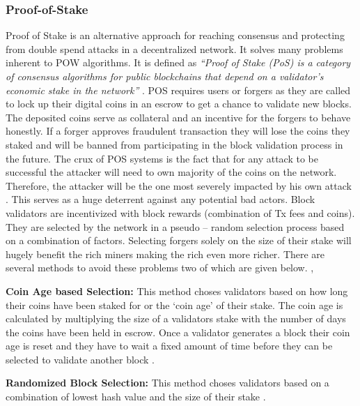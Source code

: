 \subsubsection{Proof-of-Stake} \label{PS}
Proof of Stake is an alternative approach for reaching consensus and protecting from double spend attacks in a decentralized network. It solves many problems inherent to POW algorithms. It is defined as \textit{“Proof of Stake (PoS) is a category of consensus algorithms for public blockchains that depend on a validator's economic stake in the network”} \cite{ethwiki:006}. POS requires users or forgers as they are called to lock up their digital coins in an escrow to get a chance to validate new blocks. The deposited coins serve as collateral and an incentive for the forgers to behave honestly. If a forger approves fraudulent transaction they will lose the coins they staked and will be banned from participating in the block validation process in the future. The crux of POS systems is the fact that for any attack to be successful the attacker will need to own majority of the coins on the network. Therefore, the attacker will be the one most severely impacted by his own attack \cite{bitwiki:005}. This serves as a huge deterrent against any potential bad actors. Block validators are incentivized with block rewards (combination of Tx fees and coins). They are selected by the network in a pseudo – random selection process based on a combination of factors. Selecting forgers solely on the size of their stake will hugely benefit the rich miners making the rich even more richer. There are several methods to avoid these problems two of which are given below. \cite{medium:002}, \cite{misc:001}

\textbf{Coin Age based Selection:}
This method choses validators based on how long their coins have been staked for or the ‘coin age’ of their stake. The coin age is calculated by multiplying the size of a validators stake with the number of days the coins have been held in escrow. Once a validator generates a block their coin age is reset and they have to wait a fixed amount of time before they can be selected to validate another block \cite{misc:001}.

\textbf{Randomized Block Selection:}
This method choses validators based on a combination of lowest hash value and the size of their stake \cite{misc:001}.

\vspace{0.5cm}  
